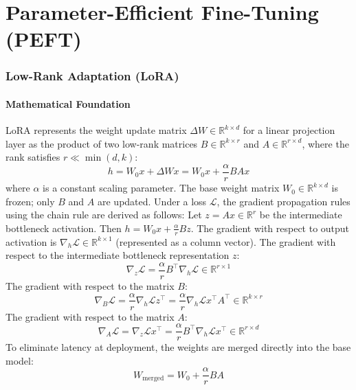 \newpage
\part{Parameter-Efficient Fine-Tuning (PEFT)}

\section{Low-Rank Adaptation (LoRA)}

\subsection{Mathematical Foundation}
LoRA represents the weight update matrix $\Delta W \in \mathbb{R}^{k \times d}$ for a linear projection layer as the product of two low-rank matrices $B \in \mathbb{R}^{k \times r}$ and $A \in \mathbb{R}^{r \times d}$, where the rank satisfies $r \ll \min(d, k)$:
\begin{equation}
  h = W_0 x + \Delta W x = W_0 x + \frac{\alpha}{r} B A x
\end{equation}
where $\alpha$ is a constant scaling parameter. The base weight matrix $W_0 \in \mathbb{R}^{k \times d}$ is frozen; only $B$ and $A$ are updated. Under a loss $\mathcal{L}$, the gradient propagation rules using the chain rule are derived as follows:
Let $z = A x \in \mathbb{R}^r$ be the intermediate bottleneck activation. Then $h = W_0 x + \frac{\alpha}{r} B z$.
The gradient with respect to output activation is $\nabla_h \mathcal{L} \in \mathbb{R}^{k \times 1}$ (represented as a column vector).
The gradient with respect to the intermediate bottleneck representation $z$:
\begin{equation}
  \nabla_z \mathcal{L} = \frac{\alpha}{r} B^\top \nabla_h \mathcal{L} \in \mathbb{R}^{r \times 1}
\end{equation}
The gradient with respect to the matrix $B$:
\begin{equation}
  \nabla_B \mathcal{L} = \frac{\alpha}{r} \nabla_h \mathcal{L} z^\top = \frac{\alpha}{r} \nabla_h \mathcal{L} x^\top A^\top \in \mathbb{R}^{k \times r}
\end{equation}
The gradient with respect to the matrix $A$:
\begin{equation}
  \nabla_A \mathcal{L} = \nabla_z \mathcal{L} x^\top = \frac{\alpha}{r} B^\top \nabla_h \mathcal{L} x^\top \in \mathbb{R}^{r \times d}
\end{equation}
To eliminate latency at deployment, the weights are merged directly into the base model:
\begin{equation}
  W_{\text{merged}} = W_0 + \frac{\alpha}{r} B A
\end{equation}

